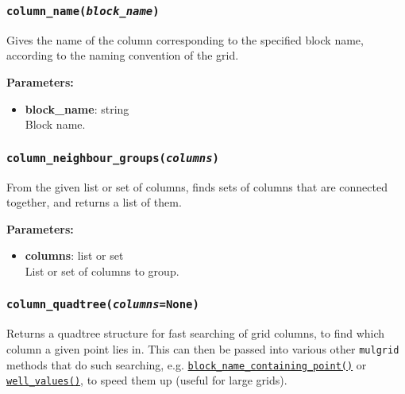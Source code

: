 \begin{snugshade}\subsubsection{\texttt{column\_name(\emph{block\_name})}}\end{snugshade}
\label{sec:mulgrid:column_name}

Gives the name of the column corresponding to the specified block name, according to the naming convention of the grid.

\textbf{Parameters:}
\begin{itemize}
\item \textbf{block\_name}: string\\
  Block name.
\end{itemize}

\begin{snugshade}\subsubsection{\texttt{column\_neighbour\_groups(\emph{columns})}}\end{snugshade}
\label{sec:mulgrid:column_neighbour_groups}

From the given list or set of columns, finds sets of columns that are connected together, and returns a list of them.

\textbf{Parameters:}
\begin{itemize}
\item \textbf{columns}: list or set\\
  List or set of columns to group.
\end{itemize}

\begin{snugshade}\subsubsection{\texttt{column\_quadtree(\emph{columns}=None)}}\end{snugshade}
\label{sec:mulgrid:column_quadtree}

Returns a quadtree structure for fast searching of grid columns, to find which column a given point lies in.  This can then be passed into various other \texttt{mulgrid} methods that do such searching, e.g. \hyperref[sec:mulgrid:block_name_containing_point]{\texttt{block\_name\_containing\_point()}} or \hyperref[sec:mulgrid:well_values]{\texttt{well\_values()}}, to speed them up (useful for large grids).

